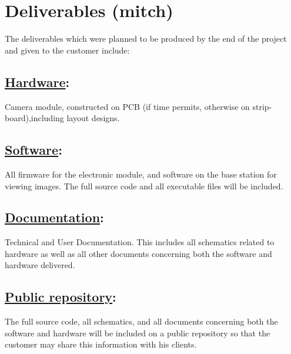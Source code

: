 \section{Deliverables (mitch)}

The deliverables which were planned to be produced by the end of the project and given to the customer include:

	\subsection{\underline{Hardware}:} \label{sec:deliv_hw} Camera module, constructed on PCB (if time permits, otherwise on strip-board),including layout designs.
	\subsection{\underline{Software}:} \label{sec:deliv_sw} All firmware for the electronic module, and software on the base station for viewing images. The full source code and all executable files will be included.
	\subsection{\underline{Documentation}:} \label{sec:deliv_doc} Technical and User Documentation. This includes all schematics related to hardware as well as all other documents concerning both the software and hardware delivered.
	\subsection{\underline{Public repository}:} \label{sec:deliv_git} The full source code, all schematics, and all documents concerning both the software and hardware will be included on a public repository so that the customer may share this information with his clients.

